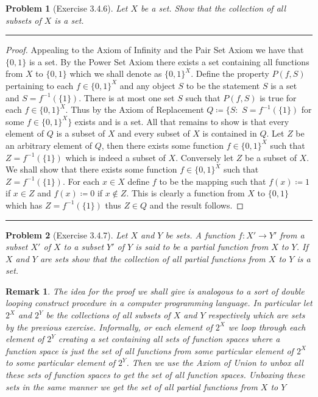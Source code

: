 \documentclass{article}
\newcommand{\lined}{\noindent\rule{\textwidth}{1pt}}
\newtheorem*{problem}{Problem}
\newtheorem*{remark}{Remark}
\begin{document}
	\newpage
	
	\begin{problem}[Exercise 3.4.6]
			Let $X$ be a set. Show that the collection of all subsets of $X$ is a set.
	\end{problem}
	
	\lined
		\begin{proof}
		Appealing to the Axiom of Infinity and the Pair Set Axiom we have that $\{0,1\}$ is a set. 
		By the Power Set Axiom there exists a set containing all functions from $X$ to $\{0,1\}$ which
		we shall denote as $\{0,1\}^X$. Define the property $P(f,S)$ pertaining to each $f \in \{0,1\}^X$ and
		any object $S$ to be the statement $S$ is a set and $S = f^{-1}(\{1\})$.  There is at most one set $S$ 
		such that $P(f,S)$ is true for each $f \in \{0,1\}^X$. Thus by the Axiom of Replacement
		$Q \coloneqq \{S:$ $S = f^{-1}(\{1\})$ for some $f \in \{0,1\}^X\}$ exists and is a set. All that remains to show
		is that every element of $Q$ is a subset of $X$ and every subset of $X$ is contained in $Q$. Let $Z$ be an arbitrary
		element of $Q$, then there exists some function $f \in \{0,1\}^X$ such that $Z = f^{-1}(\{1\})$ which is indeed a subset of
		$X$. Conversely let $Z$ be a subset of $X$. We shall show that there exists some function 
		$f \in \{0,1\}^X$ such that $Z = f^{-1}(\{1\})$. For each $x \in X$ define $f$ to be the mapping such that 
		$f(x) \coloneqq 1$ if $x \in Z$ and $f(x) \coloneqq 0$ if $x \notin Z$. This is clearly a function from $X$ to $\{0,1\}$ which has
		$Z = f^{-1}(\{1\})$ thus $Z \in Q$ and the result follows.
		
	\end{proof}
	\lined
	
	\newpage
	
	\begin{problem}[Exercise 3.4.7]
		Let $X$ and $Y$ be sets. A function $f:X' \rightarrow Y'$ from a subset $X'$ of $X$ to a subset $Y'$ of $Y$ is
		said to be a partial function from $X$ to $Y$. If $X$ and $Y$ are sets show that the collection of all partial functions
		from $X$ to $Y$ is a set.
	\end{problem}

	\begin{remark}
		The idea for the proof we shall give is analogous to a sort of double looping construct procedure in a
		computer programming language. In particular let $2^X$ and $2^Y$ be the collections of all subsets of $X$ and
		$Y$ respectively which are sets by the previous exercise. Informally, or each element of $2^X$ we loop through each element of
		$2^Y$ creating a set containing all sets of function spaces where a function space is just the set of all functions from some
		particular element of $2^X$ to some particular element of $2^Y$. Then we use the Axiom of Union to unbox all these sets of function spaces to get the set of all function spaces. Unboxing these sets in the same manner we get the set of all partial functions from $X$ to $Y$	\end{remark}
\end{document}
